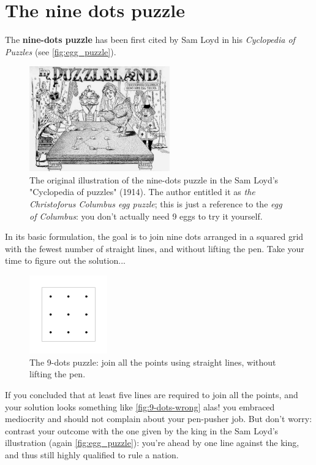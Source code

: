 \documentclass[11pt]{article}
\begin{document}
\hypertarget{nine-dots-puzzle} {
	\section{The nine dots puzzle}
	\label{nine-dots-puzzle}
}
The \textbf{nine-dots puzzle} has been first cited by Sam Loyd in his \emph{Cyclopedia of Puzzles} (see \autoref{fig:egg_puzzle}).
\begin{figure}[H]
	\centering
	\includegraphics[width=0.54\textwidth]{images/egg_puzzle.jpg}
	\caption{The original illustration of the nine-dots puzzle in the Sam Loyd's "Cyclopedia of puzzles" (1914). The author entitled it as \emph{the Christoforus Columbus egg puzzle}; this is just a reference to the \emph{egg of Columbus}: you don't actually need 9 eggs to try it yourself.}
\label{fig:egg_puzzle}
\end{figure}
In its basic formulation, the goal is to join nine dots arranged in a squared grid with the fewest number of straight lines, and without lifting the pen. Take your time to figure out the solution...
\begin{figure}[H]
\centering
\includegraphics[width=0.3\textwidth]{images/9-dots-grid.png}
\caption{The 9-dots puzzle: join all the points using straight lines, without lifting the pen.}
\label{fig:9-dots-grid}
\end{figure}
If you concluded that at least five lines are required to join all the points, and your solution looks something like \autoref{fig:9-dots-wrong} alas! you embraced mediocrity and should not complain about your pen-pusher job. But don't worry: contrast your outcome with the one given by the king in the Sam Loyd's illustration (again \autoref{fig:egg_puzzle}): you're ahead by one line against the king, and thus still highly qualified to rule a nation.
\end{document}

